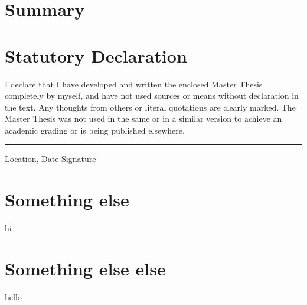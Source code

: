\documentclass[12pt, twoside]{report}
\begin{document}
\chapter{Summary}


\appendix
\chapter{Statutory Declaration}
I declare that I have developed and written the enclosed Master Thesis completely by myself, and have not used sources or means without declaration in the text. Any thoughts from others or literal quotations are clearly marked. The Master Thesis was not used in the same or in a similar version to achieve an academic grading or is being published elsewhere.
\newline
\newline
\newline
\rule{\textwidth}{1pt}
Location, Date \hfill Signature 

\chapter{Something else}
hi

\chapter{Something else else}
hello

\printbibliography
\end{document}
